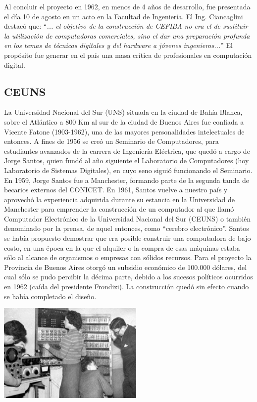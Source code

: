 \documentclass[%
  	final,
%
	notitlepage,
	narroweqnarray,
	inline,
 	twoside,
	]{ieee}
\begin{document}
Al concluir el proyecto en 1962, en menos de 4 a\~nos de desarrollo, fue presentada el d\'ia 10 de agosto en un acto en la Facultad de Ingenier\'ia. El Ing. Ciancaglini destac\'o que: ``\textit{... el objetivo de la construcci\'on de CEFIBA no era el de sustituir la utilizaci\'on de computadoras comerciales, sino el dar una preparaci\'on profunda en los temas de t\'ecnicas digitales y del hardware a j\'ovenes ingenieros...}'' El prop\'osito fue generar en el pa\'is una masa cr\'itica de profesionales en computaci\'on digital.

\subsection*{CEUNS}

La Universidad Nacional del Sur (UNS) situada en la ciudad de Bah\'ia Blanca, sobre el Atl\'antico a 800 Km al sur de la ciudad de Buenos Aires fue confiada a Vicente Fatone (1903-1962), una de las mayores personalidades intelectuales de entonces. A fines de 1956 se cre\'o un Seminario de Computadores, para estudiantes avanzados de la carrera de Ingenier\'ia El\'ectrica, que qued\'o a cargo de Jorge Santos, quien fund\'o al a\~no siguiente el Laboratorio de Computadores (hoy Laboratorio de Sistemas Digitales), en cuyo seno sigui\'o funcionando el Seminario.
En 1959, Jorge Santos fue a Manchester, formando parte de la segunda tanda de becarios externos del CONICET. En 1961, Santos vuelve a nuestro pa\'is y aprovech\'o la experiencia adquirida durante su estancia en la Universidad de Manchester para emprender la construcci\'on de un computador al que llam\'o Computador Electr\'onico de la Universidad Nacional del Sur (CEUNS) o tambi\'en denominado por la prensa, de aquel entonces, como ``cerebro electr\'onico''. Santos se hab\'ia propuesto demostrar que era posible construir una computadora de bajo costo, en una \'epoca en la que el alquiler o la compra de esas m\'aquinas estaba s\'olo al alcance de organismos o empresas con s\'olidos recursos. Para el proyecto la Provincia de Buenos Aires otorg\'o un subsidio econ\'omico de 100.000 d\'olares, del cual s\'olo se pudo percibir la d\'ecima parte, debido a los sucesos pol\'iticos ocurridos en 1962 (ca\'ida del presidente Frondizi). La construcci\'on qued\'o sin efecto cuando se hab\'ia completado el dise\~no.

\begin{center}\includegraphics[width=200pt, height=136pt]{ceuns.png}\end{center}
\end{document}
